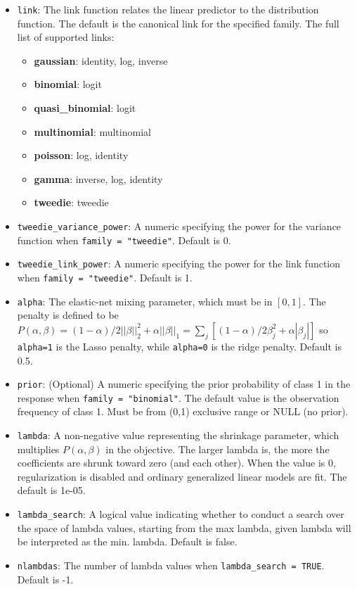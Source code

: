 \begin{itemize}
\item \texttt{link}: The link function relates the linear predictor to the distribution function. The default is the canonical link for the specified family. The full list of supported links: 
	\begin{itemize}
\item	{\textbf {gaussian}}: identity, log, inverse 
\item {\textbf{binomial}}: logit 
\item {\textbf{quasi\_binomial}}: logit
\item {\textbf{multinomial}}: multinomial
\item {\textbf{poisson}}: log, identity
\item {\textbf{gamma}}: inverse, log, identity
\item {\textbf{tweedie}}: tweedie 
	\end{itemize}
\item \texttt{tweedie\_variance\_power}: A numeric specifying the power for the variance function when \texttt{family = "tweedie"}.  Default is 0.
\item \texttt{tweedie\_link\_power}: A numeric specifying the power for the link function when \texttt{family = "tweedie"}.  Default is 1.
\item \texttt{alpha}: The elastic-net mixing parameter, which must be in $[0,1]$. The penalty is defined to be $P(\alpha,\beta) = (1-\alpha)/2||\beta||_2^2 + \alpha||\beta||_1 = \sum_j [(1-\alpha)/2 \beta_j^2 + \alpha|\beta_j|] $ so \texttt{alpha=1} is the Lasso penalty, while \texttt{alpha=0} is the ridge penalty. Default is 0.5.
\item \texttt{prior}: (Optional) A numeric specifying the prior probability of class 1 in the response when \texttt{family = "binomial"}. The default value is the observation frequency of class 1. Must be from (0,1) exclusive range or NULL (no prior).
\item \texttt{lambda}: A non-negative value representing the shrinkage parameter, which multiplies $P(\alpha,\beta)$ in the objective. The larger lambda is, the more the coefficients are shrunk toward zero (and each other). When the value is 0, regularization is disabled and ordinary generalized linear models are fit. The default is 1e-05.
\item \texttt{lambda\_search}: A logical value indicating whether to conduct a search over the space of lambda values, starting from the max lambda, given lambda will be interpreted as the min. lambda. Default is false.
\item \texttt{nlambdas}: The number of lambda values when \texttt{lambda\_search = TRUE}. Default is -1.

\end{itemize}
